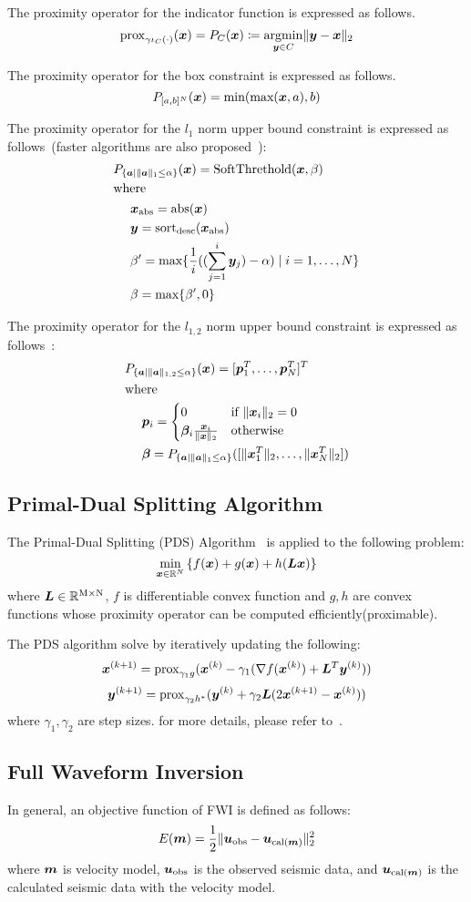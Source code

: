 The proximity operator for the indicator function is expressed as follows.
\begin{equation} \label{eq:ProximityOperatorDefinitionWithIndicatorFunctionEq}
\proximityOperator{ \gamma \indicatorFunction{C}{\cdot} }{\vecx} = P_C(\vecx) \coloneq \argmin{\vecy \in C} \LTwoNorm{\vecy - \vecx}
\end{equation}

The proximity operator for the box constraint is expressed as follows.
\begin{equation} \label{eq:ProximityOperatorForBoxConstraint} \projBoxSolution \end{equation}

The proximity operator for the $l_1$ norm upper bound constraint is expressed as follows~\cite{L1-ball-projection}(faster algorithms are also proposed~\cite{fast-L1-ball-projection}):
\begin{equation} \label{eq:ProximityOperatorForL1Ball}  \projLOneBallSolution \end{equation}

The proximity operator for the $l_{1,2}$ norm upper bound constraint is expressed as follows~\cite{L12-ball-projection}:
\begin{equation} \label{eq:ProximityOperatorForL12Ball} \projLOneTwoBallSolution \end{equation}

\subsection{Primal-Dual Splitting Algorithm}\label{subsec:primal-dual-splitting-algorithm}
The Primal-Dual Splitting (PDS) Algorithm~\cite{PDS0,PDS1,PDS2,PDS3} is applied to the following problem:
\begin{equation} \label{eq:PDSPrimalEq} \PDSPrimal \end{equation}
where $\bm{L} \in \realNumber^{\intM \times \intN}$, $f$ is differentiable convex function and $g,h$ are convex functions whose proximity operator can be computed efficiently(proximable).

The PDS algorithm solve by iteratively updating the following:
\begin{equation} \label{eq:PDSSubStepX} \PDSSubStepX \end{equation}
\begin{equation} \label{eq:PDSSubStepY} \PDSSubStepY \end{equation}
where $\gamma_1, \gamma_2$ are step sizes.
for more details, please refer to~\cite{PDS2}.

\subsection{Full Waveform Inversion}\label{subsec:full-waveform-inversion}
In general, an objective function of FWI is defined as follows:
\begin{equation} \label{eq:FWIObjective} \FWIObjectiveDefinition \end{equation}
where $\velModel$ is velocity model, $\seismicData_{\mathrm{obs}}$ is the observed seismic data, and $\seismicData_{\mathrm{cal}(\velModel)}$ is the calculated seismic data with the velocity model.
